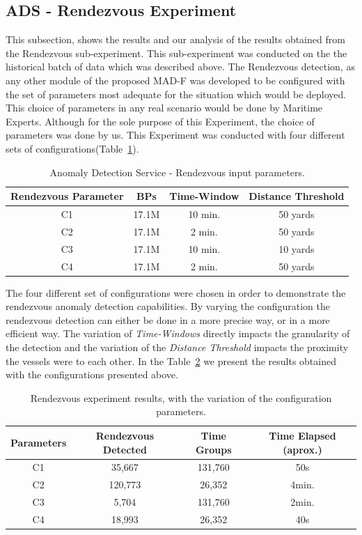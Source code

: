 \subsection{ADS - Rendezvous Experiment}
\label{subsection: ADS - Rendezvous Experiment}
This subsection, shows the results and our analysis of the results obtained from the Rendezvous sub-experiment. This sub-experiment was conducted on the the historical batch of data which was described above. The Rendezvous detection, as any other module of the proposed MAD-F was developed to be configured with the set of parameters most adequate for the situation which would be deployed. This choice of parameters in any real scenario would be done by Maritime Experts. Although for the sole purpose of this Experiment, the choice of parameters was done by us. This Experiment was conducted with four different sets of configurations(Table~\ref{Table: 5 ADS Rendezvous input paramenters}).

\begin{table}[H]
\centering
\caption{Anomaly Detection Service - Rendezvous input parameters.}
\label{Table: 5 ADS Rendezvous input paramenters}
\begin{tabular}{@{}cccc@{}}
\toprule
Rendezvous Parameter & BPs & Time-Window & Distance Threshold \\ \midrule
C1 & 17.1M & 10 min. & 50 yards \\
C2 & 17.1M & 2 min. & 50 yards \\
C3 & 17.1M & 10 min. & 10 yards \\
C4 & 17.1M & 2 min. & 50 yards \\ \bottomrule
\end{tabular}
\end{table}

The four different set of configurations were chosen in order to demonstrate the rendezvous anomaly detection capabilities. By varying the configuration the rendezvous detection can either be done in a more precise way, or in a more efficient way. The variation of \emph{Time-Windows} directly impacts the granularity of the detection and the variation of the \emph{Distance Threshold} impacts the proximity the vessels were to each other. In the Table~\ref{Table: 5 ADS Rendezvous results} we present the results obtained with the configurations presented above.

\begin{table}[H]
\centering
\caption{Rendezvous experiment results, with the variation of the configuration parameters. }
\label{Table: 5 ADS Rendezvous results}
\begin{tabular}{@{}cccc@{}}
\toprule
Parameters & Rendezvous Detected & Time Groups & Time Elapsed (aprox.) \\ \midrule
C1 & 35,667 & 131,760 & 50s \\
C2 & 120,773 & 26,352 & 4min. \\
C3 & 5,704 & 131,760 & 2min. \\
C4 & 18,993 & 26,352 & 40s \\ \bottomrule
\end{tabular}
\end{table}

